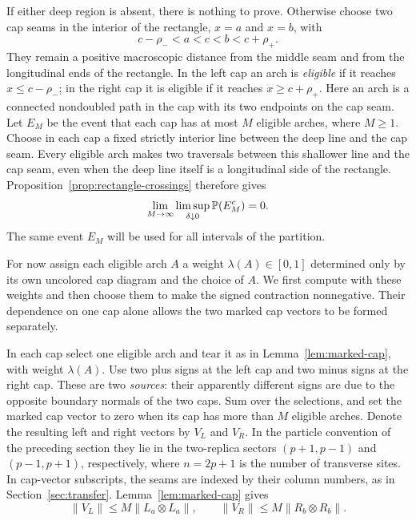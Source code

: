If either deep region is absent, there is nothing to prove.  Otherwise
choose two cap seams in the interior of the rectangle, $x=a$ and $x=b$, with
\[
 c-\rho_-<a<c<b<c+\rho_+.
\]
They remain a positive macroscopic distance from the middle seam and
from the longitudinal ends of the rectangle.  In the left cap an arch
is \emph{eligible} if it reaches $x\le c-\rho_-$; in the right cap it is
eligible if it reaches $x\ge c+\rho_+$.  Here an arch is a connected
nondoubled path in the cap with its two endpoints on the cap seam.
Let $E_M$ be the event that each cap has at most $M$ eligible arches,
where $M\ge1$.  Choose in each cap a fixed strictly interior line
between the deep line and the cap seam.  Every eligible arch makes two
traversals between this shallower line and the cap seam, even when the
deep line itself is a longitudinal side of the rectangle.
Proposition~\ref{prop:rectangle-crossings} therefore gives
\begin{equation}
 \lim_{M\to\infty}\limsup_{\delta\downarrow0}\mathbb P(E_M^c)=0.
 \label{eq:cap-cutoff-tight}
\end{equation}
The same event $E_M$ will be used for all intervals of the partition.

For now assign each eligible arch $A$ a weight $\lambda(A)\in[0,1]$
determined only by its own uncolored cap diagram and the choice of $A$.
We first compute with these weights and then choose them to make the
signed contraction nonnegative.  Their dependence on one cap alone
allows the two marked cap vectors to be formed separately.

In each cap select one eligible arch and tear it as in
Lemma~\ref{lem:marked-cap}, with weight $\lambda(A)$.
Use two plus signs at the left cap and two minus signs at the right cap.
These are two \emph{sources}: their apparently different signs are due
to the opposite boundary normals of the two caps.  Sum over the
selections, and set the marked cap vector to zero when its cap has more
than $M$ eligible arches.  Denote the resulting left and right vectors
by $V_L$ and $V_R$.  In the particle convention of the preceding section
they lie in the two-replica sectors $(p+1,p-1)$ and $(p-1,p+1)$,
respectively, where $n=2p+1$ is the number of transverse sites.
In cap-vector subscripts, the seams are indexed by their column numbers,
as in Section~\ref{sec:transfer}.  Lemma~\ref{lem:marked-cap} gives
\[
 \|V_L\|\le M\|L_a\otimes L_a\|,
 \qquad \|V_R\|\le M\|R_b\otimes R_b\|.
\]

